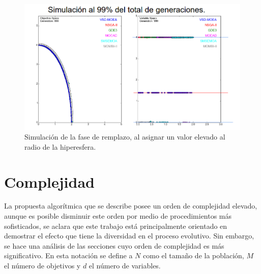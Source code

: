 \begin{figure}[H]
\centering
\scriptsize
\includegraphics[scale=0.35]
{Figures_Chapter3/Simulacion_Algoritmo_5.png}
\decoRule
\caption{Simulación de la fase de remplazo, al asignar un valor elevado al radio de la hiperesfera.}
\label{fig:Simulacion_Algoritmo_6}
\end{figure}

\section{Complejidad}

La propuesta algorítmica que se describe posee un orden de complejidad elevado, aunque es posible disminuir este orden por medio de procedimientos más sofisticados, se aclara que este trabajo está principalmente orientado en demostrar el efecto que tiene la diversidad en el proceso evolutivo.
%
Sin embargo, se hace una análisis de las secciones cuyo orden de complejidad es más significativo.
%
En esta notación se define a $N$ como el tamaño de la población, $M$ el número de objetivos y $d$ el número de variables.
%

